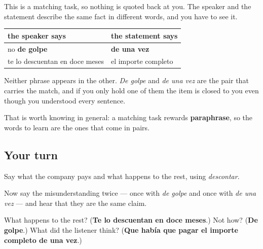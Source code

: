 \begin{grammarlens}[title={Grammar Lens: the match is between two phrases, not two words}]
This is a matching task, so nothing is quoted back at you. The speaker and the statement describe the same fact in different words, and you have to see it.

\noindent
\begin{tabularx}{\linewidth}{@{}>{\raggedright\arraybackslash}X>{\raggedright\arraybackslash}X@{}}
\toprule
\textbf{the speaker says} & \textbf{the statement says} \\
\midrule
no \textbf{de golpe} & \textbf{de una vez} \\
te lo descuentan en doce meses & el importe completo \\
\bottomrule
\end{tabularx}

Neither phrase appears in the other. \emph{De golpe} and \emph{de una vez} are the pair that carries the match, and if you only hold one of them the item is closed to you even though you understood every sentence.

That is worth knowing in general: a matching task rewards \textbf{paraphrase}, so the words to learn are the ones that come in pairs.
\end{grammarlens}

\subsection*{Your turn}
Say what the company pays and what happens to the rest, using \emph{descontar}.

Now say the misunderstanding twice — once with \emph{de golpe} and once with \emph{de una vez} — and hear that they are the same claim.

\begin{tcolorbox}[breakable,colback=teal!4,colframe=teal!35!black,title={Before you move on}]
What happens to the rest? (\textbf{Te lo descuentan en doce meses}.) Not how? (\textbf{De golpe}.) What did the listener think? (\textbf{Que había que pagar el importe completo de una vez}.)
\end{tcolorbox}
